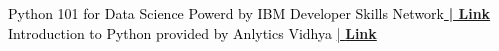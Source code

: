 \documentclass[10pt,a4paper,ragged2e,withhyper]{altacv}
\begin{document}
\begin{paracol}{1}
         \textcolor{black}{\small Python 101 for Data Science Powerd by IBM Developer Skills Network\href{https://cutt.ly/CDh2U9n}{ \textbf{| \small Link}}} \\
         \textcolor{black}{\small Introduction to Python provided by Anlytics Vidhya \href{https://cutt.ly/fDh0se7}{| \textbf{\small Link}} }
         
\vspace{-10pt}

        
           
        
        
 \newpage        

           

        
 

\end{paracol}
\end{document}
